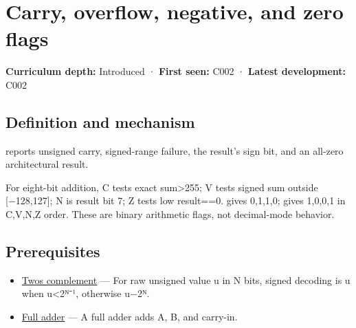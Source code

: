 \hypertarget{appendix-8d687c9c08ab}{}\label{referencestart:appendix-8d687c9c08ab}
\section{Carry, overflow, negative, and zero flags}\label{appendix-8d687c9c08ab-carry-overflow-negative-and-zero-flags}

\hypertarget{appendix-8d687c9c08ab-carry-overflow-negative-and-zero-flags}{}

\textbf{Curriculum depth:} Introduced · \textbf{First seen:} C002 · \textbf{Latest development:} C002

\begin{allmightroledefinition}

\subsection{Definition and mechanism}\label{appendix-8d687c9c08ab-definition-and-mechanism}

\hypertarget{appendix-8d687c9c08ab-definition-and-mechanism}{}

 reports unsigned carry,  signed-range failure,  the result's sign bit, and  an all-zero architectural result.

\end{allmightroledefinition}

For eight-bit addition, C tests exact sum\textgreater255; V tests signed sum outside {[}−128,127{]}; N is result bit 7; Z tests low result==0.  gives 0,1,1,0;  gives 1,0,0,1 in C,V,N,Z order. These are binary arithmetic flags, not decimal-mode behavior.

\subsection{Prerequisites}\label{appendix-8d687c9c08ab-prerequisites}

\hypertarget{appendix-8d687c9c08ab-prerequisites}{}

\begin{itemize}
\tightlist
\item
  \hyperref[appendix-4fbc03d20829]{Two\textquotesingle s complement} --- For raw unsigned value u in N bits, signed decoding is u when u\textless2ᴺ⁻¹, otherwise u−2ᴺ.
\item
  \hyperref[appendix-d1a5b1e520c2]{Full adder} --- A full adder adds A, B, and carry-in.
\end{itemize}

